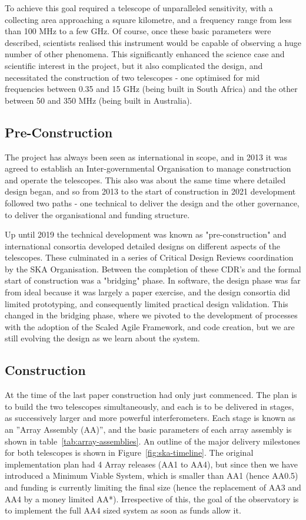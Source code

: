 \documentclass[a4paper,
               biblatex,     %
               keeplastbox,   %
               ]{jacow}
\begin{document}
To achieve this goal required a telescope of unparalleled sensitivity, with a collecting area approaching a square kilometre, and a frequency range from less than 100 MHz to a few GHz. Of course, once these basic parameters were described, scientists realised this instrument would be capable of observing a huge number of other phenomena. This significantly enhanced the science case and scientific interest in the project, but it also complicated the design, and necessitated the construction of two telescopes - one optimised for mid frequencies between 0.35 and 15 GHz (being built in South Africa) and the other between 50 and 350 MHz (being built in Australia).

\subsection{Pre-Construction}
The project has always been seen as international in scope, and in 2013 it was agreed to establish an Inter-governmental Organisation to manage construction and operate the telescopes. This also was about the same time where detailed design began, and so from 2013 to the start of construction in 2021 development followed two paths - one technical to deliver the design and the other governance, to deliver the organisational and funding structure.

Up until 2019 the technical development was known as "pre-construction" and international consortia developed detailed designs on different aspects of the telescopes. These culminated in a series of Critical Design Reviews coordination by the SKA Organisation. Between the completion of these CDR's and the formal start of construction was a "bridging" phase. In software, the design phase was far from ideal because it was largely a paper exercise, and the design consortia did limited prototyping, and consequently limited practical design validation. This changed in the bridging phase, where we pivoted to the development of processes with the adoption of the Scaled Agile Framework, and code creation, but we are still evolving the design as we learn about the system.

\subsection{Construction}
At the time of the last paper construction had only just commenced. The plan is to build the two telescopes simultaneously, and each is to be delivered in stages, as successively larger and more powerful interferometers. Each stage is known as an ''Array Assembly (AA)'', and the basic parameters of each array assembly is shown in table~\ref{tab:array-assemblies}. An outline of the major delivery milestones for both telescopes is shown in Figure~\ref{fig:ska-timeline}. The original implementation plan had 4 Array releases (AA1 to AA4), but since then we have introduced a Minimum Viable System, which is smaller than AA1 (hence AA0.5) and funding is currently limiting the final size (hence the replacement of AA3 and AA4 by a money limited AA*). Irrespective of this, the goal of the observatory is to implement the full AA4 sized system as soon as funds allow it.
\end{document}
